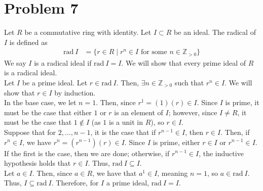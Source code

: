 \documentclass[8pt]{extarticle}
\newcommand{\Z}{\mathbb{Z}}
\begin{document}
  \section{Problem 7}%
  Let $R$ be a commutative ring with identity. Let $I\subset R$ be an ideal. The radical of $I$ is defined as
  \begin{align*}
    \text{rad}~I &= \{r\in R\mid r^n\in I\text{ for some } n\in \Z_{>0}\}
  \end{align*}
  We say $I$ is a radical ideal if $\text{rad}~I = I$. We will show that every prime ideal of $R$ is a radical ideal.\\

  Let $I$ be a prime ideal. Let $r\in \text{rad}~I$. Then, $\exists n\in \Z_{>0}$ such that $r^{n} \in I$. We will show that $r\in I$ by induction.\\

  In the base case, we let $n = 1$. Then, since $r^{1} = (1)(r) \in I$. Since $I$ is prime, it must be the case that either $1$ or $r$ is an element of $I$; however, since $I \neq R$, it must be the case that $1\notin I$ (as $1$ is a unit in $R$), so $r\in I$.\\

  Suppose that for $2,\dots,n-1$, it is the case that if $r^{n-1}\in I$, then $r\in I$. Then, if $r^{n}\in I$, we have $r^{n} = (r^{n-1})(r)\in I$. Since $I$ is prime, either $r\in I$ or $r^{n-1}\in I$. If the first is the case, then we are done; otherwise, if $r^{n-1}\in I$, the inductive hypothesis holds that $r\in I$. Thus, $\text{rad}~I \subseteq I$.\\

  Let $a\in I$. Then, since $a \in R$, we have that $a^{1}\in I$, meaning $n=1$, so $a\in \text{rad}~I$. Thus, $I\subseteq \text{rad}~I$. Therefore, for $I$ a prime ideal, $\text{rad}~I = I$.
\end{document}
